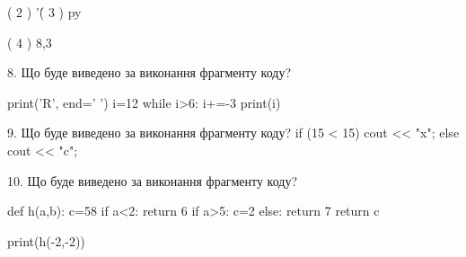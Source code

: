 \documentclass[11pt]{article}
\begin{document}
( 2 ) '\'

( 3 ) py

( 4 ) 8,3
\vspace{5mm}

8. Що буде виведено за виконання фрагменту коду?

print('R', end=' ')
i=12
while i>6:
    i+=-3
print(i)

\vspace{5mm}

9. Що буде виведено за виконання фрагменту коду?
if (15 < 15)
    cout << "x";
else
    cout << "c";

\vspace{5mm}

10. Що буде виведено за виконання фрагменту коду?

def h(a,b):
    c=58
    if a<2:
        return 6
    if a>5:
         c=2
    else: 
        return 7
    return c

print(h(-2,-2))
\vspace{5mm}

\newpage
\end{document}
